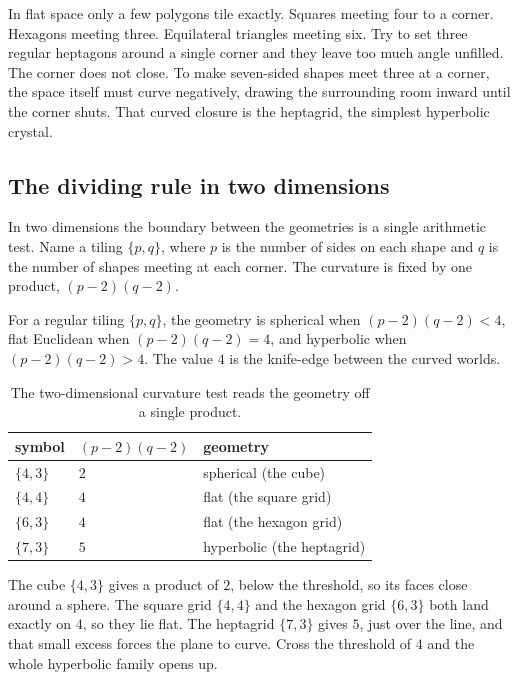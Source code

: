 In flat space only a few polygons tile exactly. Squares meeting four to a corner. Hexagons meeting three. Equilateral triangles meeting six. Try to set three regular heptagons around a single corner and they leave too much angle unfilled. The corner does not close. To make seven-sided shapes meet three at a corner, the space itself must curve negatively, drawing the surrounding room inward until the corner shuts. That curved closure is the heptagrid, the simplest hyperbolic crystal.

\subsection{The dividing rule in two dimensions}

In two dimensions the boundary between the geometries is a single arithmetic test. Name a tiling $\{p,q\}$, where $p$ is the number of sides on each shape and $q$ is the number of shapes meeting at each corner. The curvature is fixed by one product, $(p-2)(q-2)$.

\begin{definition}
For a regular tiling $\{p,q\}$, the geometry is spherical when $(p-2)(q-2) < 4$, flat Euclidean when $(p-2)(q-2) = 4$, and hyperbolic when $(p-2)(q-2) > 4$. The value $4$ is the knife-edge between the curved worlds.
\end{definition}

\begin{table}[ht]
\centering
\begin{tabular}{@{}lll@{}}
\toprule
symbol & $(p-2)(q-2)$ & geometry \\
\midrule
$\{4,3\}$ & $2$ & spherical (the cube) \\
$\{4,4\}$ & $4$ & flat (the square grid) \\
$\{6,3\}$ & $4$ & flat (the hexagon grid) \\
$\{7,3\}$ & $5$ & hyperbolic (the heptagrid) \\
\bottomrule
\end{tabular}
\caption{The two-dimensional curvature test reads the geometry off a single product.}
\label{tab:two-d-curvature}
\end{table}

The cube $\{4,3\}$ gives a product of $2$, below the threshold, so its faces close around a sphere. The square grid $\{4,4\}$ and the hexagon grid $\{6,3\}$ both land exactly on $4$, so they lie flat. The heptagrid $\{7,3\}$ gives $5$, just over the line, and that small excess forces the plane to curve. Cross the threshold of $4$ and the whole hyperbolic family opens up.


